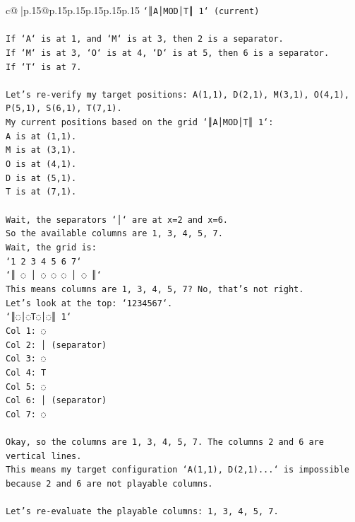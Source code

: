\documentclass{article}
\begin{document}
{\begin{supertabular}{c@{$\;$}|p{.15\linewidth}@{}p{.15\linewidth}p{.15\linewidth}p{.15\linewidth}p{.15\linewidth}p{.15\linewidth}}
{{{\texttt{`║A│MOD│T║ 1` (current)} \\
\\ 
\texttt{If `A` is at 1, and `M` is at 3, then 2 is a separator.} \\
\texttt{If `M` is at 3, `O` is at 4, `D` is at 5, then 6 is a separator.} \\
\texttt{If `T` is at 7.} \\
\\ 
\texttt{Let's re{-}verify my target positions: A(1,1), D(2,1), M(3,1), O(4,1), P(5,1), S(6,1), T(7,1).} \\
\texttt{My current positions based on the grid `║A│MOD│T║ 1`:} \\
\texttt{A is at (1,1).} \\
\texttt{M is at (3,1).} \\
\texttt{O is at (4,1).} \\
\texttt{D is at (5,1).} \\
\texttt{T is at (7,1).} \\
\\ 
\texttt{Wait, the separators `│` are at x=2 and x=6.} \\
\texttt{So the available columns are 1, 3, 4, 5, 7.} \\
\texttt{Wait, the grid is:} \\
\texttt{`1 2 3 4 5 6 7`} \\
\texttt{`║ ◌ │ ◌ ◌ ◌ │ ◌ ║`} \\
\texttt{This means columns are 1, 3, 4, 5, 7? No, that's not right.} \\
\texttt{Let's look at the top: `1234567`.} \\
\texttt{`║◌│◌T◌│◌║ 1`} \\
\texttt{Col 1: ◌} \\
\texttt{Col 2: │ (separator)} \\
\texttt{Col 3: ◌} \\
\texttt{Col 4: T} \\
\texttt{Col 5: ◌} \\
\texttt{Col 6: │ (separator)} \\
\texttt{Col 7: ◌} \\
\\ 
\texttt{Okay, so the columns are 1, 3, 4, 5, 7. The columns 2 and 6 are vertical lines.} \\
\texttt{This means my target configuration `A(1,1), D(2,1)...` is impossible because 2 and 6 are not playable columns.} \\
\\ 
\texttt{Let's re{-}evaluate the playable columns: 1, 3, 4, 5, 7.} \\
}}}
\end{supertabular}}
\end{document}
